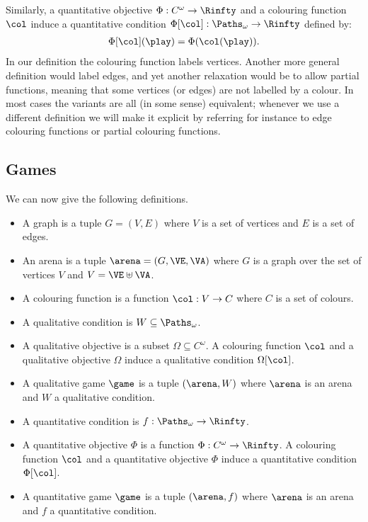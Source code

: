 \documentclass[letterpaper,10pt,english]{sphinxmanual}
\begin{document}
Similarly, a quantitative objective \(\Phi : C^\omega \to \Rinfty\) and a
colouring function \(\col\) induce a quantitative condition
\(\Phi[\col] : \Paths_\omega \to \Rinfty\) defined by:
\begin{equation*}
\begin{split}\Phi[\col](\play) = \Phi(\col(\play)).\end{split}
\end{equation*}
In our definition the colouring function labels vertices. Another more
general definition would label edges, and yet another relaxation would
be to allow partial functions, meaning that some vertices (or edges) are
not labelled by a colour. In most cases the variants are all (in some
sense) equivalent; whenever we use a different definition we will make
it explicit by referring for instance to edge colouring functions or
partial colouring functions.


\subsection{Games}
\label{\detokenize{1_Introduction/simple:games}}\label{\detokenize{1_Introduction/simple:subsec-games}}
We can now give the following definitions.
\begin{itemize}
\item {} 
A graph is a tuple \(G = (V,E)\) where \(V\) is a set of vertices and \(E\) is a set of edges.

\item {} 
An arena is a tuple \(\arena = (G,\VE,\VA)\) where \(G\) is a graph over the set of vertices \(V\) and \(V = \VE \uplus \VA\).

\item {} 
A colouring function is a function \(\col : V \to C\) where \(C\) is a set of colours.

\item {} 
A qualitative condition is \(W \subseteq \Paths_\omega\).

\item {} 
A qualitative objective is a subset \(\Omega \subseteq C^\omega\). A colouring function \(\col\) and a qualitative objective \(\Omega\) induce a qualitative condition \(\Omega[\col]\).

\item {} 
A qualitative game \(\game\) is a tuple \((\arena,W)\) where \(\arena\) is an arena and \(W\) a qualitative condition.

\item {} 
A quantitative condition is \(f : \Paths_\omega \to \Rinfty\).

\item {} 
A quantitative objective \(\Phi\) is a function \(\Phi : C^\omega \to \Rinfty\). A colouring function \(\col\) and a quantitative objective \(\Phi\) induce a quantitative condition \(\Phi[\col]\).

\item {} 
A quantitative game \(\game\) is a tuple \((\arena,f)\) where \(\arena\) is an arena and \(f\) a quantitative condition.

\end{itemize}
\end{document}
